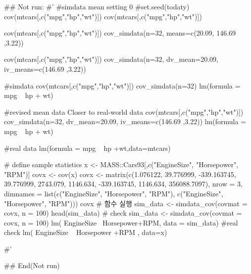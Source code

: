 \documentclass[a4paper]{book}
\begin{document}
\begin{Examples}
\begin{ExampleCode}

\#\# Not run: 
#'
#simdata mean setting 0
#set.seed(todaty)
cov(mtcars[,c("mpg","hp","wt")]) %
cov(mtcars[,c("mpg","hp","wt")]) %

cov(mtcars[,c("mpg","hp","wt")]) %
  cov_simdata(n=32, means=c(20.09, 146.69 ,3.22))

cov(mtcars[,c("mpg","hp","wt")]) %
  cov_simdata(n=32, dv_mean=20.09, iv_means=c(146.69 ,3.22))

#simdata
cov(mtcars[,c("mpg","hp","wt")]) %
  cov_simdata(n=32) %
  lm(formula = mpg ~ hp + wt)%

#revised mean data Closer to real-world data
cov(mtcars[,c("mpg","hp","wt")]) %
  cov_simdata(n=32, dv_mean=20.09, iv_means=c(146.69 ,3.22)) %
  lm(formula = mpg ~ hp + wt)%


#real data
lm(formula = mpg ~ hp +wt,data=mtcars)%



# define sample statistics
x <- MASS::Cars93[,c("EngineSize", "Horsepower", "RPM")]
covx <- cov(x)
covx <- matrix(c(1.076122, 39.776999, -339.163745,
                 39.776999, 2743.079, 1146.634,
                 -339.163745, 1146.634, 356088.7097), nrow = 3,
               dimnames = list(c("EngineSize", "Horsepower", "RPM"),
                               c("EngineSize", "Horsepower", "RPM")))
covx
# 함수 실행
sim_data <- simdata_cov(covmat = covx, n = 100)
head(sim_data)
# check
sim_data <- simdata_cov(covmat = covx, n = 100)
lm( EngineSize~ Horsepower+RPM, data = sim_data) %
#real check
lm( EngineSize ~ Horsepower +RPM , data=x)%



#'

## End(Not run)
\end{ExampleCode}
\end{Examples}
\end{document}
